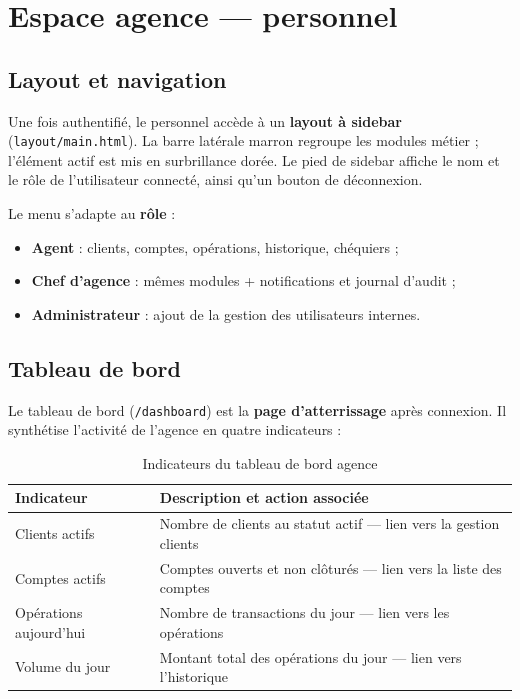 \section{Espace agence — personnel}

\subsection{Layout et navigation}

Une fois authentifié, le personnel accède à un \textbf{layout à sidebar} (\texttt{layout/main.html}). La barre latérale marron regroupe les modules métier ; l'élément actif est mis en surbrillance dorée. Le pied de sidebar affiche le nom et le rôle de l'utilisateur connecté, ainsi qu'un bouton de déconnexion.

Le menu s'adapte au \textbf{rôle} :
\begin{itemize}[leftmargin=*]
    \item \textbf{Agent} : clients, comptes, opérations, historique, chéquiers ;
    \item \textbf{Chef d'agence} : mêmes modules + notifications et journal d'audit ;
    \item \textbf{Administrateur} : ajout de la gestion des utilisateurs internes.
\end{itemize}

\subsection{Tableau de bord}

Le tableau de bord (\texttt{/dashboard}) est la \textbf{page d'atterrissage} après connexion. Il synthétise l'activité de l'agence en quatre indicateurs :

\begin{table}[H]
    \centering
    \caption{Indicateurs du tableau de bord agence}
    \label{tab:kpi-agence}
    \small
    \begin{tabular}{@{}lp{8cm}@{}}
        \toprule
        \textbf{Indicateur} & \textbf{Description et action associée} \\
        \midrule
        Clients actifs & Nombre de clients au statut actif — lien vers la gestion clients \\
        Comptes actifs & Comptes ouverts et non clôturés — lien vers la liste des comptes \\
        Opérations aujourd'hui & Nombre de transactions du jour — lien vers les opérations \\
        Volume du jour & Montant total des opérations du jour — lien vers l'historique \\
        \bottomrule
    \end{tabular}
\end{table}

